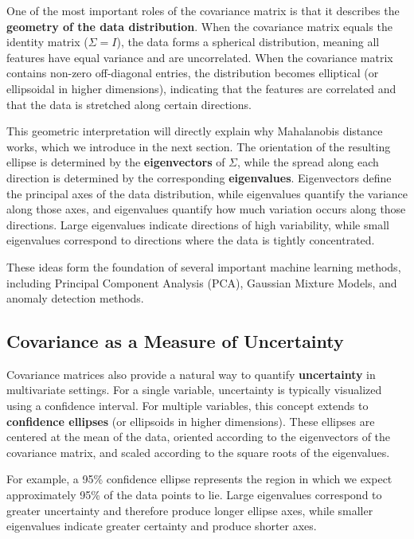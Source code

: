 \documentclass{article}
\begin{document}
One of the most important roles of the covariance matrix is that it describes the 
\textbf{geometry of the data distribution}. When the covariance matrix equals the 
identity matrix ($\Sigma = I$), the data forms a spherical distribution, meaning all features have equal variance and are uncorrelated.
When the covariance matrix 
contains non-zero off-diagonal entries, the distribution becomes elliptical (or 
ellipsoidal in higher dimensions), indicating that the features are correlated 
and that the data is stretched along certain directions.

This geometric interpretation will directly explain why Mahalanobis
distance works, which we introduce in the next section. The orientation of the resulting ellipse is determined by the 
\textbf{eigenvectors} of $\Sigma$, while the spread along each direction is 
determined by the corresponding \textbf{eigenvalues}. Eigenvectors define the principal axes of the data distribution,
while eigenvalues quantify the variance along those axes, and eigenvalues 
quantify how much variation occurs along those directions. Large eigenvalues 
indicate directions of high variability, while small eigenvalues correspond to 
directions where the data is tightly concentrated.

These ideas form the foundation of several important machine learning methods, 
including Principal Component Analysis (PCA), Gaussian Mixture Models, and 
anomaly detection methods.

\subsection*{Covariance as a Measure of Uncertainty}

Covariance matrices also provide a natural way to quantify \textbf{uncertainty} 
in multivariate settings. For a single variable, uncertainty is typically 
visualized using a confidence interval. For multiple variables, this concept 
extends to \textbf{confidence ellipses} (or ellipsoids in higher dimensions). 
These ellipses are centered at the mean of the data, oriented according to the 
eigenvectors of the covariance matrix, and scaled according to the square roots 
of the eigenvalues.

For example, a 95\% confidence ellipse represents the region in which we expect 
approximately 95\% of the data points to lie. Large eigenvalues correspond to 
greater uncertainty and therefore produce longer ellipse axes, while smaller 
eigenvalues indicate greater certainty and produce shorter axes.
\end{document}

